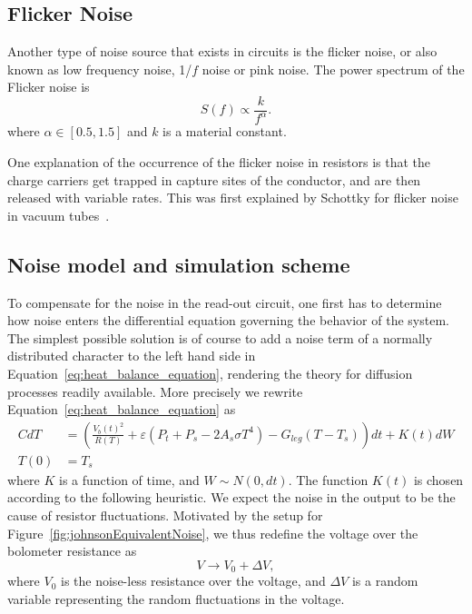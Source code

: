 \subsection{Flicker Noise}

Another type of noise source that exists in circuits is the flicker
noise, or also known as low frequency noise, 1/$f$ noise or pink noise. The power
spectrum of the Flicker noise is
\begin{equation}
  \label{eq:power_spectrum_flicker_noise}
  S(f) \propto \frac{k}{f^{\alpha}}.
\end{equation}
where $\alpha \in [0.5, 1.5]$ and $k$ is a material constant.

One explanation of the occurrence of the flicker noise in resistors is
that the charge carriers get trapped in capture sites of the
conductor, and are then released with variable rates. This was first
explained by Schottky for flicker noise in vacuum tubes~\cite{PhysRev.28.74}.


\subsection{Noise model and simulation scheme}

To compensate for the noise in the read-out circuit, one first has to
determine how noise enters the differential equation governing the
behavior of the system. The simplest possible solution is of course to 
add a noise term of a normally distributed character to the left hand side 
in Equation~\eqref{eq:heat_balance_equation}, rendering the theory for 
diffusion processes readily available. More precisely we rewrite Equation~\eqref{eq:heat_balance_equation}
as 
\begin{align} \label{eq:heat_balance_equation_noise1}
 CdT&=(\frac{V_b(t)^2}{R(T)}+\varepsilon(P_t+P_s -2A_s \sigma T^4)-G_{leg}(T-T_s))dt + K(t)dW \\
 T(0)&=T_s	\nonumber
\end{align}
where $K$ is a function of time, and $W \sim N(0, dt)$.
The function $K(t)$ is chosen according to the following heuristic.
We expect the noise in the output to be the cause of resistor fluctuations.
Motivated by the setup for Figure~\ref{fig:johnsonEquivalentNoise}, we thus redefine the voltage over
the bolometer resistance as
\begin{equation}
  \label{eq:randomvariable_transformation}
  V \rightarrow V_0 + \Delta V,
\end{equation}
where $V_0$ is the noise-less resistance over the voltage, and $\Delta
V$ is a random variable representing the random fluctuations in the
voltage. 

